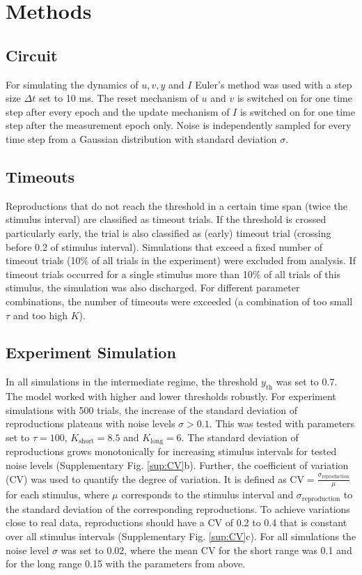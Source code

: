 \documentclass[10pt]{article}
\begin{document}
\section{Methods}
\subsection*{Circuit}
For simulating the dynamics of $u, v, y$ and $I$ Euler's method was used with a step size $\Delta t$ set to 10 ms.
The reset mechanism of $u$ and $v$ is switched on for one time step after every epoch and the update mechanism of $I$ is switched on for one time step after the measurement epoch only.
Noise is independently sampled for every time step from a Gaussian distribution with standard deviation $\sigma$.

\subsection*{Timeouts}
Reproductions that do not reach the threshold in a certain time span (twice the stimulus interval) are classified as timeout trials. 
If the threshold is crossed particularly early, the trial is also classified as (early) timeout trial (crossing before 0.2 of stimulus interval).
Simulations that exceed a fixed number of timeout trials (10\% of all trials in the experiment) were excluded from analysis.
If timeout trials occurred for a single stimulus more than 10\% of all trials of this stimulus, the simulation was also discharged.
For different parameter combinations, the number of timeouts were exceeded (a combination of too small $\tau$ and too high $K$).


\subsection*{Experiment Simulation}
In all simulations in the intermediate regime, the threshold $y_\text{th}$ was set to 0.7. The model worked with higher and lower thresholds robustly.  
For experiment simulations with 500 trials, the increase of the standard deviation of reproductions plateaus with noise levels $\sigma > 0.1$. This was tested with parameters set to $\tau=100$, $K_\text{short}=8.5$ and $K_\text{long}=6$.
The standard deviation of reproductions grows monotonically for increasing stimulus intervals for tested noise levels (Supplementary Fig. \ref{sup:CV}b).
Further, the coefficient of variation (CV) was used to quantify the degree of variation. It is defined as $\text{CV}=\frac{\sigma_\text{reproduction}}{\mu}$ for each stimulus, where $\mu$ corresponds to the stimulus interval and $\sigma_\text{reproduction}$ to the standard deviation of the corresponding reproductions. 
To achieve variations close to real data, reproductions should have a CV of 0.2 to 0.4 that is constant over all stimulus intervals (Supplementary Fig. \ref{sup:CV}c).
For all simulations the noise level $\sigma$ was set to 0.02, where the mean CV for the short range was 0.1 and for the long range 0.15 with the parameters from above.
\end{document}

